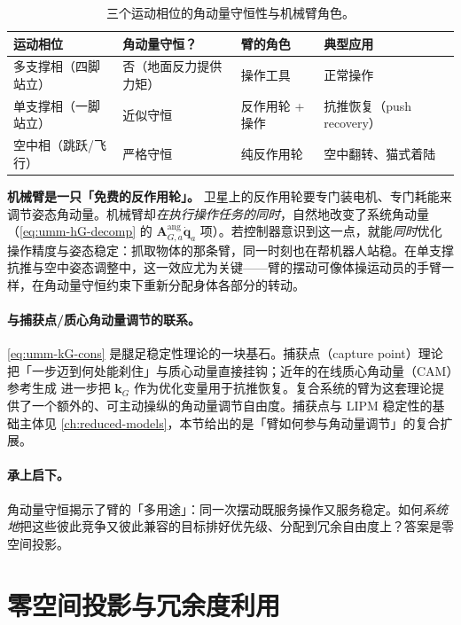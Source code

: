 \begin{table}[H]\centering\small
\caption{三个运动相位的角动量守恒性与机械臂角色。}
\label{tab:umm-phases}
\begin{tabular}{llll}
\toprule
运动相位 & 角动量守恒？ & 臂的角色 & 典型应用 \\
\midrule
多支撑相（四脚站立） & 否（地面反力提供力矩） & 操作工具 & 正常操作 \\
单支撑相（一脚站立） & 近似守恒 & 反作用轮 + 操作 & 抗推恢复（push recovery） \\
空中相（跳跃/飞行） & 严格守恒 & 纯反作用轮 & 空中翻转、猫式着陆 \\
\bottomrule
\end{tabular}
\end{table}

\begin{insight}
\textbf{机械臂是一只「免费的反作用轮」。}\;
卫星上的反作用轮要专门装电机、专门耗能来调节姿态角动量。机械臂却\emph{在执行操作任务的同时}，自然地改变了系统角动量（\cref{eq:umm-hG-decomp} 的 $\mathbf A_{G,a}^{\text{ang}}\dot{\mathbf q}_a$ 项）。若控制器意识到这一点，就能\emph{同时}优化操作精度与姿态稳定：抓取物体的那条臂，同一时刻也在帮机器人站稳。在单支撑抗推与空中姿态调整中，这一效应尤为关键——臂的摆动可像体操运动员的手臂一样，在角动量守恒约束下重新分配身体各部分的转动。
\end{insight}

\paragraph{与捕获点/质心角动量调节的联系。}
\cref{eq:umm-kG-cons} 是腿足稳定性理论的一块基石。捕获点（capture point）理论\cite{pratt2006capture} 把「一步迈到何处能刹住」与质心动量直接挂钩；近年的在线质心角动量（CAM）参考生成\cite{schuller2021online} 进一步把 $\mathbf k_G$ 作为优化变量用于抗推恢复。复合系统的臂为这套理论提供了一个额外的、可主动操纵的角动量调节自由度。捕获点与 LIPM 稳定性的基础主体见 \cref{ch:reduced-models}，本节给出的是「臂如何参与角动量调节」的复合扩展。

\paragraph{承上启下。}
角动量守恒揭示了臂的「多用途」：同一次摆动既服务操作又服务稳定。如何\emph{系统地}把这些彼此竞争又彼此兼容的目标排好优先级、分配到冗余自由度上？答案是零空间投影。

\section{零空间投影与冗余度利用}
\label{sec:umm-nullspace}

